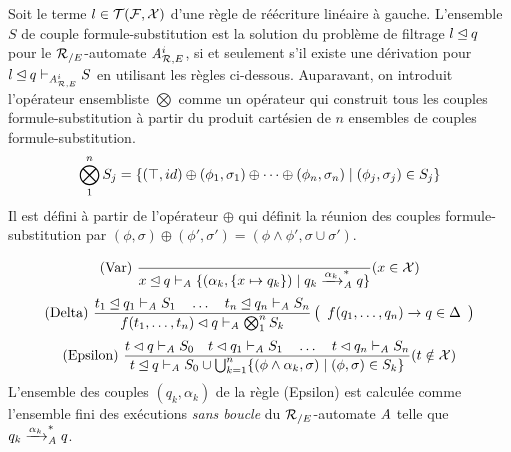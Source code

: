 \begin{definition}
  \label{def:matching-algorithm}
  Soit le terme $l \in \mathcal{T(F, X)}$ d'une règle de réécriture linéaire à gauche.
  L'ensemble $S$ de couple formule-substitution est la solution du problème de filtrage
  $l \unlhd q$ pour le ${\mathcal R_{/E}}$-automate ${\mathit A}_{\mathcal R,E}^i$, si et seulement s'il existe une dérivation pour 
  $l \unlhd q \vdash_{{\mathit A}_{\mathcal R,E}^i} S$ en utilisant les règles ci-dessous.
  Auparavant, on introduit  l'opérateur ensembliste $\bigotimes$ comme un opérateur qui
  construit tous les couples formule-substitution à partir du produit cartésien
  de $n$ ensembles de couples formule-substitution.
  \[\bigotimes_1^n S_j = \{ (\top, id) \oplus (\phi_1, \sigma_1) \oplus \dots \oplus (\phi_n, \sigma_n) \; | \; (\phi_j,\sigma_j) \in S_j\}\]
  Il est défini à partir de l'opérateur $\oplus$ qui définit la réunion des couples formule-substitution par
  $(\phi, \sigma) \oplus (\phi', \sigma') = (\phi \land \phi',\sigma \cup \sigma')$.
  
  {\footnotesize
    \[\textrm{(Var) }
    \dfrac{}
    {x \unlhd q \vdash_\mathit A \{(\alpha_k, \{x \mapsto q_k\}) \; | \; q_k \xrightarrow{\alpha_k}^*_\mathit A q\}}
    (x \in \mathcal X)
    \]
    \[\textrm{(Delta) }
    \dfrac{
      t_1 \unlhd q_1 \vdash_\mathit A S_1
      \quad \dots \quad
      t_n \unlhd q_n \vdash_\mathit A S_n
    }{f(t_1, \dots, t_n) \lhd q \vdash_\mathit A \bigotimes_1^n S_k
    }\left(
      \begin{array}{l}
        f(q_1, \dots, q_n) \rightarrow q \in \Delta\\
      \end{array}
    \right )
    \]
    \[\textrm{(Epsilon) }
    \dfrac{ 
      t \lhd q    \vdash_\mathit A S_0   \quad
      t \lhd q_1 \vdash_\mathit A S_1 \quad \dots \quad
      t \lhd q_n \vdash_\mathit A S_n
    }{
      t \unlhd q \vdash_\mathit A S_0 \cup
      \bigcup_{k=1}^n \{(\phi \land \alpha_k, \sigma) \; | \; (\phi, \sigma) \in S_k\}
    }
    (t \notin \mathcal X)
    \]
  }
  L'ensemble des couples $(q_k, \alpha_k)$ de la règle (Epsilon) est calculée comme l'ensemble fini des exécutions
  \emph{sans boucle} du ${\mathcal R_{/E}}$-automate $\mathit A$ telle que $q_k \xrightarrow{\alpha_k}^*_\mathit A q$.

\end{definition}
